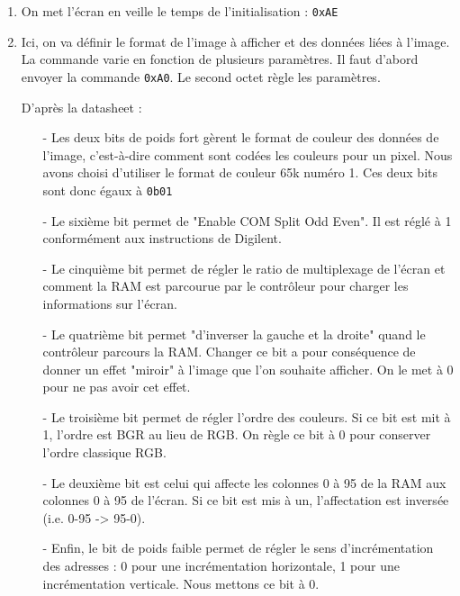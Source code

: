 \documentclass[11pt]{article}
\begin{document}
\begin{enumerate}
    \item On met l'écran en veille le temps de l'initialisation : \texttt{0xAE}

    \item Ici, on va définir le format de l'image à afficher et des données liées à l'image. La commande varie en fonction de plusieurs paramètres. Il faut d'abord envoyer la commande \texttt{0xA0}. Le second octet règle les paramètres. 

    D'après la datasheet : 
    \begin{itemize}
        \item[-] Les deux bits de poids fort gèrent le format de couleur des données de l'image, c'est-à-dire comment sont codées les couleurs pour un pixel. Nous avons choisi d'utiliser le format de couleur 65k numéro 1. Ces deux bits sont donc égaux à \texttt{0b01}
        \item[-] Le sixième bit permet de "Enable COM Split Odd Even". Il est réglé à 1 conformément aux instructions de Digilent. 
        \item[-] Le cinquième bit permet de régler le ratio de multiplexage de l'écran et comment la RAM est parcourue par le contrôleur pour charger les informations sur l'écran. %
        \item[-] Le quatrième bit permet "d'inverser la gauche et la droite" quand le contrôleur parcours la RAM. Changer ce bit a pour conséquence de donner un effet "miroir" à l'image que l'on souhaite afficher. On le met à 0 pour ne pas avoir cet effet. 
        \item[-] Le troisième bit permet de régler l'ordre des couleurs. Si ce bit est mit à 1, l'ordre est BGR au lieu de RGB. On règle ce bit à 0 pour conserver l'ordre classique RGB. 
        \item[-] Le deuxième bit est celui qui affecte les colonnes 0 à 95 de la RAM aux colonnes 0 à 95 de l'écran. Si ce bit est mis à un, l'affectation est inversée (i.e. 0-95 -> 95-0).
        \item[-] Enfin, le bit de poids faible permet de régler le sens d'incrémentation des adresses : 0 pour une incrémentation horizontale, 1 pour une incrémentation verticale. Nous mettons ce bit à 0. 
    \end{itemize}

    \newpage


\end{enumerate}
\end{document}
